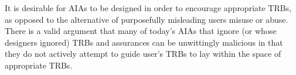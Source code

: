     It is desirable for AIAs to be designed in order to encourage appropriate TRBs, as opposed to the alternative of purposefully misleading users misuse or abuse. There is a valid argument that many of today's AIAs that ignore (or whose designers ignored) TRBs and assurances can be unwittingly malicious in that they do not actively attempt to guide user's TRBs to lay within the space of appropriate TRBs.


